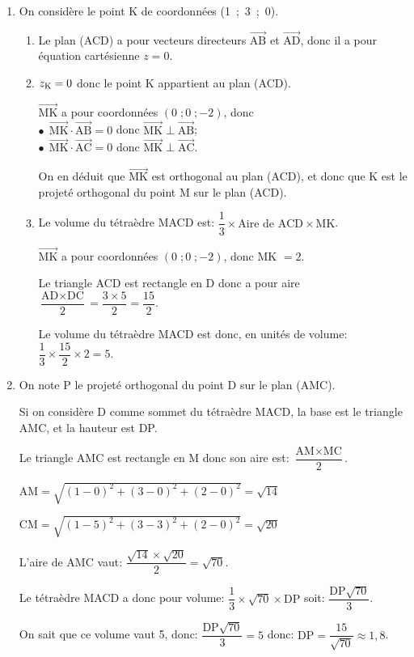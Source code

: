 \documentclass[10pt]{article}
\providecommand{\vectt}[1]{\overrightarrow{\mathrm{#1}}}
\providecommand{\ds}{\displaystyle}
\begin{document}
\begin{enumerate}[resume]
\item On considère le point K de coordonnées (1~;~3~;~0).
	\begin{enumerate}
		\item
Le plan (ACD) a pour vecteurs directeurs $\vectt{AB}$ et $\vectt{AD}$, donc il a pour équation cartésienne $z=0$.
		
		\item 
$z_{\text K}=0$ donc le point K appartient au plan (ACD).

$\vectt{MK}$ a pour coordonnées $(0\;; 0\;; -2)$, donc \\
$\bullet~~\vectt{MK}\cdot\vectt{AB} = 0$ donc $\vectt{MK}\perp\vectt{AB}$;\\
$\bullet~~\vectt{MK}\cdot\vectt{AC} = 0$ donc $\vectt{MK}\perp\vectt{AC}$.

On en déduit que $\vectt{MK}$ est orthogonal au plan (ACD), et donc que K est le projeté orthogonal du point M sur le plan (ACD).
	
		\item Le volume du tétraèdre MACD est:
$\dfrac{1}{3}\times \text{Aire de ACD} \times \text{MK}$.

$\vectt{MK}$ a pour coordonnées $(0\;; 0\;; -2)$, donc MK $=2$.

Le triangle ACD est rectangle en D donc a pour aire 
$\dfrac{\text{AD}\times\text{DC}}{2}=\dfrac{ 3\times 5}{2}=\dfrac{15}{2}$.

Le volume du tétraèdre MACD est donc, en unités de volume:
$\dfrac{1}{3} \times \dfrac{15}{2} \times 2 = 5$.

\end{enumerate}	
	
\item On note P le projeté orthogonal du point D sur le plan (AMC).



Si on considère D comme sommet du tétraèdre MACD, la base est le triangle AMC, et la hauteur est DP.

Le triangle AMC est rectangle en M donc son aire est:
$\dfrac{\text{AM} \times \text{MC}}{2}$.

$\text{AM} = \ds\sqrt{(1-0)^2+(3-0)^2+(2-0)^2} = \ds\sqrt{14}$

$\text{CM} = \ds\sqrt{(1-5)^2+(3-3)^2+(2-0)^2}= \ds\sqrt{20}$

L'aire de AMC vaut: $\dfrac{\ds\sqrt{14}\times \sqrt{20}}{2}=\ds\sqrt{70}$.

Le tétraèdre MACD a donc pour volume: $\dfrac{1}{3}\times\ds\sqrt{70}\times\text{DP}$ soit: $\dfrac{\text{DP} \ds\sqrt{70}}{3}$.

On sait que ce volume vaut 5, donc: 
$\dfrac{\text{DP} \ds\sqrt{70}}{3} = 5$ donc:
$\text{DP}= \dfrac{15}{\ds\sqrt{70}} \approx 1,8$.
\end{enumerate}
\end{document}
